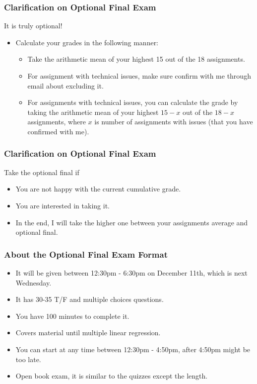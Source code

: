 \documentclass[12pt]{beamer}
\begin{document}
		\begin{frame}
		\frametitle{Clarification on Optional Final Exam}
{\large\color{red} It is truly optional!}
			\begin{itemize}[label={\color{blue}$\blacktriangleright$}]
				\item Calculate your grades in the following manner:
				\begin{itemize}[label={\color{blue}$\blacktriangleright$}]
					\item Take the arithmetic mean of your highest 15 out of the 18 assignments.
					\item For assignment with technical issues, make sure confirm with me through email about excluding it.
					\item For assignments with technical issues, you can calculate the grade by taking the arithmetic mean of your highest $15-x$ out of the $18-x$ assignments, where $x$ is number of  assignments with issues (that you have confirmed with me).
					
				\end{itemize}

				
					\end{itemize}
			
			\end{frame}
					\begin{frame}
					\frametitle{Clarification on Optional Final Exam}
			Take the optional final if
			\begin{itemize}[label={\color{blue}$\blacktriangleright$}]
				\item You are not happy with the current cumulative grade.
				\item You are interested in taking it.
				\item In the end, I will take the higher one between your assignments average and optional final.
			\end{itemize}

	\end{frame}
	\begin{frame}
		\frametitle{About the Optional Final Exam Format}
		\begin{itemize}[label={\color{blue}$\blacktriangleright$}]
			\item It will be given between 12:30pm - 6:30pm on December 11th, which is next Wednesday.
			\item It has 30-35 T/F and multiple choices questions.
			\item You have 100 minutes to complete it.
			\item Covers material until multiple linear regression.
			\item You can start at any time between 12:30pm - 4:50pm, after 4:50pm might be too late.
			\item Open book exam, it is similar to the quizzes except the length.
		\end{itemize}
		
	\end{frame}
\end{document}

